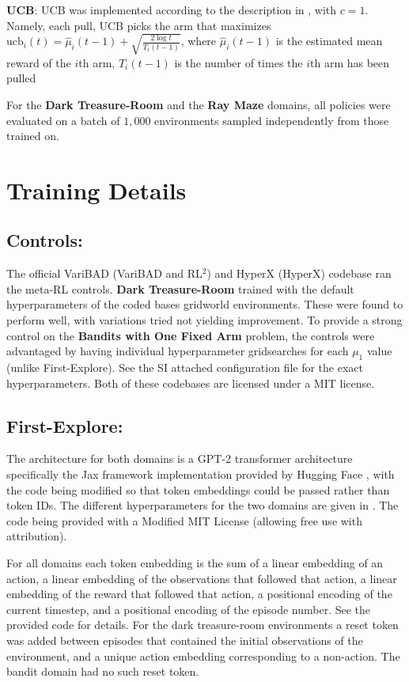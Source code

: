 \documentclass{article}
\begin{document}
\textbf{UCB}: UCB was implemented according to the description in \cite{rl2}, with \(c=1\). Namely, each pull, UCB picks the arm that maximizes \(\text{ucb}_i(t) = \hat{\mu}_i(t - 1) + \sqrt{\frac{2\log t}{T_i(t-1)}}\), where \(\hat{\mu}_i(t - 1)\) is the estimated mean reward of the \(i\)th arm, \(T_i(t-1)\) is the number of times the \(i\)th arm has been pulled

For the \textbf{Dark Treasure-Room} and the \textbf{Ray Maze} domains, all policies were evaluated on a batch of \(1,000\) environments sampled independently from those trained on. 

\section{Training Details}
\label{app:training}

\subsection{Controls:}

The official VariBAD \cite{VariBAD} (VariBAD and RL\(^2\)) and HyperX \cite{hyperx} (HyperX) codebase ran the meta-RL controls. \textbf{Dark Treasure-Room} trained with the default hyperparameters of the coded bases gridworld environments. These were found to perform well, with variations tried not yielding improvement. To provide a strong control on the \textbf{Bandits with One Fixed Arm} problem, the controls were advantaged by having individual hyperparameter gridsearches for each \(\mu_1\) value (unlike First-Explore). See the SI attached configuration file for the exact hyperparameters. Both of these codebases are licensed under a MIT license.

\subsection{First-Explore:}

The architecture for both domains is a GPT-2 transformer architecture \citep{radford2019language} specifically the Jax framework \citep{jax2018github} implementation provided by Hugging Face \citep{wolf2020huggingfaces}, with the code being modified so that token embeddings could be passed rather than token IDs. The different hyperparameters for the two domains are given in . The code being provided with a Modified MIT License (allowing free use with attribution).

For all domains each token embedding is the sum of a linear embedding of an action, a linear embedding of the observations that followed that action, a linear embedding of the reward that followed that action, a positional encoding of the current timestep, and a positional encoding of the episode number. See the provided code for details. For the dark treasure-room environments a reset token was added between episodes that contained the initial observations of the environment, and a unique action embedding corresponding to a non-action. The bandit domain had no such reset token.
\end{document}
